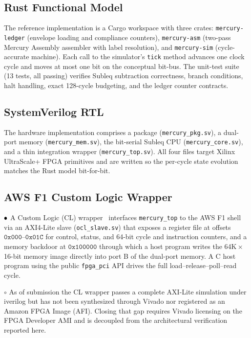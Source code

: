 \documentclass[conference,letterpaper,10pt]{IEEEtran}
\newcommand{\Plausible}{\textbf{\textcolor[rgb]{0.6,0.4,0.0}{$\bullet\hspace{-0.5em}\circ$}}}
\newcommand{\Speculative}{\textbf{\textcolor[rgb]{0.7,0.0,0.0}{$\circ$}}}
\newcommand{\code}[1]{\texttt{\small #1}}
\begin{document}
\subsection{Rust Functional Model}

The reference implementation is a Cargo workspace with three
crates: \code{mercury-ledger} (envelope loading and compliance
counters), \code{mercury-asm} (two-pass Mercury Assembly
assembler with label resolution), and \code{mercury-sim}
(cycle-accurate machine). Each call to the simulator's
\code{tick} method advances one clock cycle and moves at most one
bit on the conceptual bit-bus. The unit-test suite (13 tests,
all passing) verifies Subleq subtraction correctness, branch
conditions, halt handling, exact 128-cycle budgeting, and the
ledger counter contracts.

\subsection{SystemVerilog RTL}

The hardware implementation comprises a package
(\code{mercury\_pkg.sv}), a dual-port memory (\code{mercury\_mem.sv}),
the bit-serial Subleq CPU (\code{mercury\_core.sv}), and a thin
integration wrapper (\code{mercury\_top.sv}). All four files
target Xilinx UltraScale+ FPGA primitives and are written so
the per-cycle state evolution matches the Rust model bit-for-bit.

\subsection{AWS F1 Custom Logic Wrapper}

\Plausible{} A Custom Logic (CL) wrapper~\cite{aws_fpga}
interfaces \code{mercury\_top} to the AWS F1 shell via an
AXI4-Lite slave (\code{ocl\_slave.sv}) that exposes a register
file at offsets $\mathtt{0x000}$--$\mathtt{0x01C}$ for control,
status, and 64-bit cycle and instruction counters, and a
memory backdoor at $\mathtt{0x100000}$ through which a host
program writes the 64K\,$\times$\,16-bit memory image directly
into port B of the dual-port memory. A C host program using the
public \code{fpga\_pci} API drives the full load--release--poll--read
cycle.

\Speculative{} As of submission the CL wrapper passes a complete
AXI-Lite simulation under iverilog but has not been synthesized
through Vivado nor registered as an Amazon FPGA Image (AFI).
Closing that gap requires Vivado licensing on the FPGA Developer
AMI and is decoupled from the architectural verification reported
here.
\end{document}
